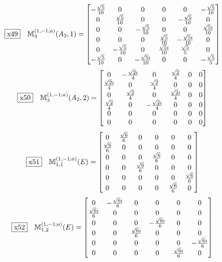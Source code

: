 \documentclass[fleqn,10pt,landscape]{jsarticle}
\begin{document}
\begin{dmath*}
\fbox{x49}\quad \mathbb{M}_{3}^{(1,-1;a)}(A_{2},1)=\begin{bmatrix} - \frac{\sqrt{5}}{10} & 0 & 0 & 0 & 0 & - \frac{\sqrt{5}}{10} \\ 0 & \frac{\sqrt{5}}{10} & 0 & 0 & - \frac{\sqrt{5}}{10} & 0 \\ 0 & 0 & - \frac{\sqrt{5}}{10} & 0 & 0 & \frac{\sqrt{5} i}{10} \\ 0 & 0 & 0 & \frac{\sqrt{5}}{10} & - \frac{\sqrt{5} i}{10} & 0 \\ 0 & - \frac{\sqrt{5}}{10} & 0 & \frac{\sqrt{5} i}{10} & \frac{\sqrt{5}}{5} & 0 \\ - \frac{\sqrt{5}}{10} & 0 & - \frac{\sqrt{5} i}{10} & 0 & 0 & - \frac{\sqrt{5}}{5} \end{bmatrix}
\end{dmath*}
\begin{dmath*}
\fbox{x50}\quad \mathbb{M}_{3}^{(1,-1;a)}(A_{2},2)=\begin{bmatrix} 0 & - \frac{\sqrt{2} i}{4} & 0 & \frac{\sqrt{2}}{4} & 0 & 0 \\ \frac{\sqrt{2} i}{4} & 0 & \frac{\sqrt{2}}{4} & 0 & 0 & 0 \\ 0 & \frac{\sqrt{2}}{4} & 0 & \frac{\sqrt{2} i}{4} & 0 & 0 \\ \frac{\sqrt{2}}{4} & 0 & - \frac{\sqrt{2} i}{4} & 0 & 0 & 0 \\ 0 & 0 & 0 & 0 & 0 & 0 \\ 0 & 0 & 0 & 0 & 0 & 0 \end{bmatrix}
\end{dmath*}
\begin{dmath*}
\fbox{x51}\quad \mathbb{M}_{1,1}^{(1,-1;a)}(E)=\begin{bmatrix} 0 & \frac{\sqrt{6}}{6} & 0 & 0 & 0 & 0 \\ \frac{\sqrt{6}}{6} & 0 & 0 & 0 & 0 & 0 \\ 0 & 0 & 0 & \frac{\sqrt{6}}{6} & 0 & 0 \\ 0 & 0 & \frac{\sqrt{6}}{6} & 0 & 0 & 0 \\ 0 & 0 & 0 & 0 & 0 & \frac{\sqrt{6}}{6} \\ 0 & 0 & 0 & 0 & \frac{\sqrt{6}}{6} & 0 \end{bmatrix}
\end{dmath*}
\begin{dmath*}
\fbox{x52}\quad \mathbb{M}_{1,2}^{(1,-1;a)}(E)=\begin{bmatrix} 0 & - \frac{\sqrt{6} i}{6} & 0 & 0 & 0 & 0 \\ \frac{\sqrt{6} i}{6} & 0 & 0 & 0 & 0 & 0 \\ 0 & 0 & 0 & - \frac{\sqrt{6} i}{6} & 0 & 0 \\ 0 & 0 & \frac{\sqrt{6} i}{6} & 0 & 0 & 0 \\ 0 & 0 & 0 & 0 & 0 & - \frac{\sqrt{6} i}{6} \\ 0 & 0 & 0 & 0 & \frac{\sqrt{6} i}{6} & 0 \end{bmatrix}
\end{dmath*}
\end{document}
